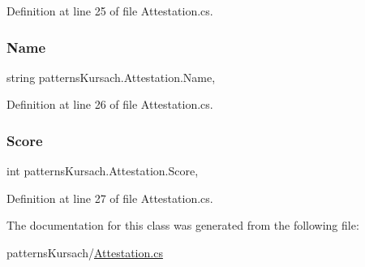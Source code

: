 Definition at line 25 of file Attestation.\+cs.

\mbox{\label{classpatterns_kursach_1_1_attestation_a54974b88500cb3e3676ad1591107575d}} 
\subsubsection{\texorpdfstring{Name}{Name}}
{\footnotesize\ttfamily string patterns\+Kursach.\+Attestation.\+Name\hspace{0.3cm}{\ttfamily [get]}, {\ttfamily [set]}}



Definition at line 26 of file Attestation.\+cs.

\mbox{\label{classpatterns_kursach_1_1_attestation_a1ab816c331523913e55579ccdfb376ce}} 
\subsubsection{\texorpdfstring{Score}{Score}}
{\footnotesize\ttfamily int patterns\+Kursach.\+Attestation.\+Score\hspace{0.3cm}{\ttfamily [get]}, {\ttfamily [set]}}



Definition at line 27 of file Attestation.\+cs.



The documentation for this class was generated from the following file\+:\begin{DoxyCompactItemize}
\item 
patterns\+Kursach/\mbox{\hyperlink{_attestation_8cs}{Attestation.\+cs}}\end{DoxyCompactItemize}
